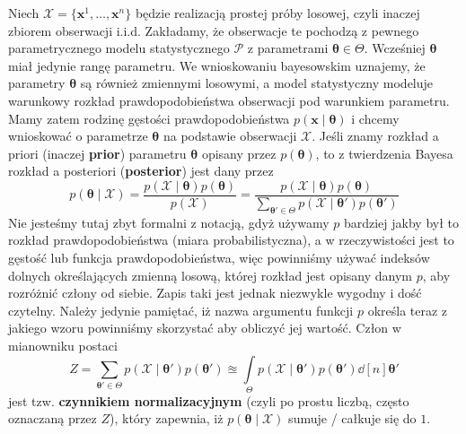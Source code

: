 \documentclass{myclass}
\numberwithin{equation}{section}
\begin{document}
Niech \(\mathcal{X} = \{\mathbf{x}^1,\ldots,\mathbf{x}^n\}\) będzie realizacją prostej próby
losowej, czyli inaczej zbiorem obserwacji i.i.d. Zakładamy, że obserwacje te pochodzą z pewnego
parametrycznego modelu statystycznego \(\mathcal{P}\) z parametrami \(\boldsymbol{\theta} \in
\Theta\). Wcześniej \(\boldsymbol{\theta}\) miał jedynie rangę parametru. We wnioskowaniu
bayesowskim uznajemy, że parametry \(\boldsymbol{\theta}\) są również zmiennymi losowymi, a model
statystyczny modeluje warunkowy rozkład prawdopodobieństwa obserwacji pod warunkiem parametru. Mamy
zatem rodzinę gęstości prawdopodobieństwa \(p(\mathbf{x} \mid \boldsymbol{\theta})\) i chcemy
wnioskować o parametrze \(\boldsymbol{\theta}\) na podstawie obserwacji \(\mathcal{X}\). Jeśli znamy
rozkład a priori (inaczej \textbf{prior}) parametru \(\boldsymbol{\theta}\) opisany przez
\(p(\boldsymbol{\theta})\), to z twierdzenia Bayesa rozkład a posteriori (\textbf{posterior}) jest
dany przez
\begin{equation}
    p(\boldsymbol{\theta} \mid \mathcal{X}) = \frac{p(\mathcal{X} \mid \boldsymbol{\theta}) p(\boldsymbol{\theta})}{p(\mathcal{X})} = \frac{p(\mathcal{X} \mid \boldsymbol{\theta}) p(\boldsymbol{\theta})}{\sum_{\boldsymbol{\theta}' \in \Theta} p(\mathcal{X} \mid \boldsymbol{\theta}') p(\boldsymbol{\theta}')}
\end{equation}
Nie jesteśmy tutaj zbyt formalni z notacją, gdyż używamy \(p\) bardziej jakby był to rozkład
prawdopodobieństwa (miara probabilistyczna), a w rzeczywistości jest to gęstość lub funkcja
prawdopodobieństwa, więc powinniśmy używać indeksów dolnych określających zmienną losową, której
rozkład jest opisany danym \(p\), aby rozróżnić człony od siebie. Zapis taki jest jednak niezwykle
wygodny i dość czytelny. Należy jedynie pamiętać, iż nazwa argumentu funkcji \(p\) określa teraz z
jakiego wzoru powinniśmy skorzystać aby obliczyć jej wartość. Człon w mianowniku postaci
\begin{equation}
     Z = \sum_{\boldsymbol{\theta}' \in \Theta} p(\mathcal{X} \mid \boldsymbol{\theta}') p (\boldsymbol{\theta}') \approxeq \int\limits_\Theta p(\mathcal{X} \mid \boldsymbol{\theta}') p (\boldsymbol{\theta}') \dd[n]{\boldsymbol{\theta}'}
\end{equation}
jest tzw. \textbf{czynnikiem normalizacyjnym} (czyli po prostu liczbą, często oznaczaną przez
\(Z\)), który zapewnia, iż \(p(\boldsymbol{\theta} \mid \mathcal{X})\) sumuje / całkuje się do
\(1\).
\end{document}
